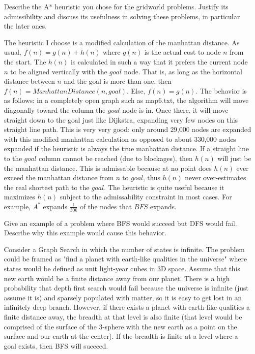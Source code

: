 \documentclass[12pt]{article}
\newenvironment{questionList}{
\newcounter{ctr}
\begin{list}{\textbf{Question \arabic{ctr}.} \\ \\ }
  {\usecounter{ctr}}
  }{
\end{list}
}
\begin{document}
\begin{questionList}
\item Describe the A* heuristic you chose for the gridworld problems.  Justify its
admissibility and discuss its usefulness in solving these problems, in
particular the later ones.

The heuristic I choose is a modified calculation of the manhattan distance. As usual, $f(n) = g(n) + h(n)$ where $g(n)$ is the actual cost to node $n$ from the start. The $h(n)$ is calculated in such a way that it prefers the current node $n$ to be aligned vertically with the $goal$ node. That is, as long as the horizontal distance between $n$ and the goal is more than one, then $f(n) = ManhattanDistance(n, goal)$. Else, $f(n) = g(n)$. The behavior is as follows: in a completely open graph such as map6.txt, the algorithm will move diagonally toward the column the $goal$ node is in. Once there, it will move straight down to the goal just like Dijkstra, expanding very few nodes on this straight line path. This is very very good: only around 29,000 nodes are expanded with this modified manhattan calculation as opposed to about 330,000 nodes expanded if the heuristic is always the true manhattan distance. If a straight line to the $goal$ column cannot be reached (due to blockages), then $h(n)$ will just be the manhattan distance. This is admissable because at no point does $h(n)$ ever exceed the manhattan distance from $n$ to $goal$, thus $h(n)$ never over-estimates the real shortest path to the $goal$. The heuristic is quite useful because it maximizes $h(n)$ subject to the admissability constraint in most cases. For example, $A^*$ expands $\frac{1}{300}$ of the nodes that $BFS$ expands. 

\item Give an example of a problem where BFS would succeed but DFS would fail.
Describe why this example would cause this behavior.

Consider a Graph Search in which the number of states is infinite. The problem could be framed as "find a planet with earth-like qualities in the universe" where states would be defined as unit light-year cubes in 3D space. Assume that this new earth would be a finite distance away from our planet. There is a high probability that depth first search would fail because the universe is infinite (just assume it is) and sparsely populated with matter, so it is easy to get lost in an infinitely deep branch. However, if there exists a planet with earth-like qualities a finite distance away, the breadth at that level is also finite (that level would be comprised of the surface of the 3-sphere with the new earth as a point on the surface and our earth at the center). If the breadth is finite at a level where a goal exists, then BFS will succeed. 


\end{questionList}
\end{document}
